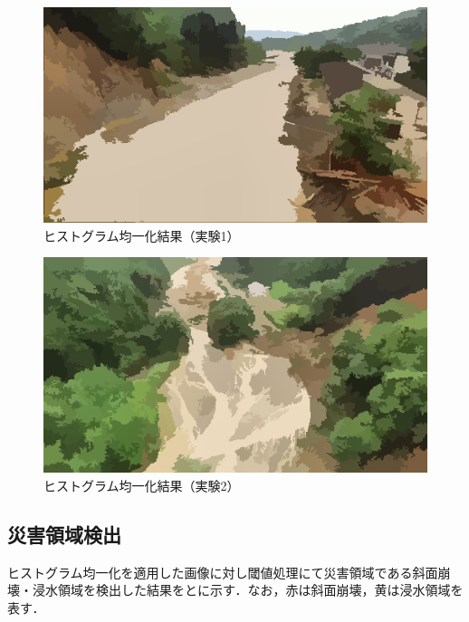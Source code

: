 \documentclass[../Thesis]{subfiles}
\begin{document}
\begin{figure}[tbp]
	\centering
	\includegraphics[width=12cm]{img/equalization1.png}
	\caption{ヒストグラム均一化結果（実験1）}
	\label{img10}
\end{figure}
\begin{figure}[tbp]
	\centering
	\includegraphics[width=12cm]{img/equalization2.png}
	\caption{ヒストグラム均一化結果（実験2）}
	\label{img11}
\end{figure}

\subsection{災害領域検出}
\label{detection}
ヒストグラム均一化を適用した画像に対し閾値処理にて災害領域である斜面崩壊・浸水領域を検出した結果をとに示す．なお，赤は斜面崩壊，黄は浸水領域を表す．
\end{document}

